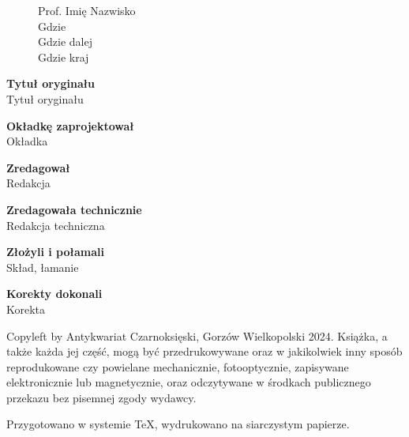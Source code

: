 

\thispagestyle{empty}
\begin{figure}[H]
\begin{minipage}[b]{.48\linewidth}
{\noindent Prof. Imię Nazwisko\\
Gdzie\\
Gdzie dalej\\
Gdzie kraj}
\end{minipage}
\end{figure}

{\noindent \textbf{Tytuł oryginału}\\Tytuł oryginału}
\vspace{5mm}

{\noindent \textbf{Okładkę zaprojektował}\\Okładka}
\vspace{5mm}

{\noindent \textbf{Zredagował}\\Redakcja}
\vspace{5mm}

{\noindent \textbf{Zredagowała technicznie}\\Redakcja techniczna}
\vspace{5mm}

{\noindent \textbf{Złożyli i połamali}\\Skład, łamanie}
\vspace{5mm}

{\noindent \textbf{Korekty dokonali}\\Korekta}

\vfill

{\noindent Copyleft by Antykwariat Czarnoksięski, Gorzów Wielkopolski 2024.
Książka, a także każda jej część, mogą być przedrukowywane oraz w jakikolwiek inny sposób reprodukowane czy powielane mechanicznie, fotooptycznie, zapisywane elektronicznie lub magnetycznie, oraz odczytywane w środkach publicznego przekazu bez pisemnej zgody wydawcy.}

\vspace{5mm}

{\noindent Przygotowano w systemie \TeX, wydrukowano na siarczystym papierze.}


